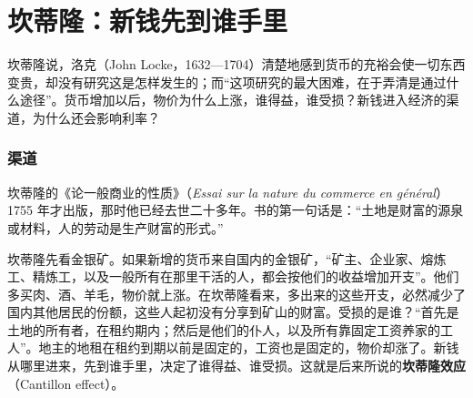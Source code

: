 
\section{坎蒂隆：新钱先到谁手里}\label{sec:merc-cantillon}

坎蒂隆说，洛克（John Locke，1632—1704）清楚地感到货币的充裕会使一切东西变贵，却没有研究这是怎样发生的；而“这项研究的最大困难，在于弄清是通过什么途径”\cite{cantillon1755}。货币增加以后，物价为什么上涨，谁得益，谁受损？新钱进入经济的渠道，为什么还会影响利率？

\subsubsection{渠道}
坎蒂隆的《论一般商业的性质》（\emph{Essai sur la nature du commerce en général}）1755 年才出版，那时他已经去世二十多年。书的第一句话是：“土地是财富的源泉或材料，人的劳动是生产财富的形式。”\cite{cantillon1755}

坎蒂隆先看金银矿。如果新增的货币来自国内的金银矿，“矿主、企业家、熔炼工、精炼工，以及一般所有在那里干活的人，都会按他们的收益增加开支”。他们多买肉、酒、羊毛，物价就上涨。在坎蒂隆看来，多出来的这些开支，必然减少了国内其他居民的份额，这些人起初没有分享到矿山的财富。受损的是谁？“首先是土地的所有者，在租约期内；然后是他们的仆人，以及所有靠固定工资养家的工人”\cite{cantillon1755}。地主的地租在租约到期以前是固定的，工资也是固定的，物价却涨了。新钱从哪里进来，先到谁手里，决定了谁得益、谁受损。这就是后来所说的\textbf{坎蒂隆效应}（Cantillon effect）。

